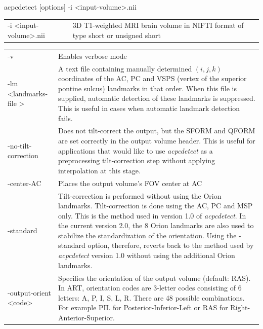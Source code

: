 \documentclass[11pt]{article}
\begin{document}

acpcdetect [options] -i \textless input-volume\textgreater.nii
\vspace{3mm}


\begin{longtable}{p{}p{}}
-i \textless input-volume\textgreater.nii &
3D T1-weighted MRI brain volume in NIFTI format of type short or unsigned short 
\end{longtable}


\begin{longtable}{p{}p{}}
-v & Enables verbose mode \\

-lm \textless landmarks-file \textgreater &
A text file containing manually determined $(i, j, k)$ coordinates
of the AC, PC and VSPS (vertex of the superior pontine sulcus) landmarks in that order. 
When this file is supplied,
automatic detection of these landmarks is suppressed. This is useful
in cases when automatic landmark detection fails.\\

-no-tilt-correction & 
Does not tilt-correct the output, but the SFORM and QFORM are set
correctly in the output volume header. This is useful for applications
that would like to use {\it acpcdetect} as a preprocessing tilt-correction
step without applying interpolation at this stage.  \\ 

-center-AC &
Places the output volume's FOV center at AC \\

-standard &
Tilt-correction is performed without using the Orion landmarks.
Tilt-correction is done using the AC, PC and MSP only. This is the
method used in version 1.0 of {\it acpcdetect}.  In the current version 2.0, the
8 Orion landmarks are also used to stabilize the standardization of the
orientation. Using the -standard option, therefore, reverts back to the method
used by {\it acpcdetect} version 1.0 without using the additional Orion landmarks. \\

-output-orient \textless code\textgreater  &
Specifies the orientation of the output volume (default: RAS). 
In ART, orientation codes are 3-letter codes consisting of 6 letters:
A, P, I, S, L, R.  There are 48 possible combinations. For example
PIL for Posterior-Inferior-Left or RAS for Right-Anterior-Superior. \\


\end{longtable}
\end{document}
